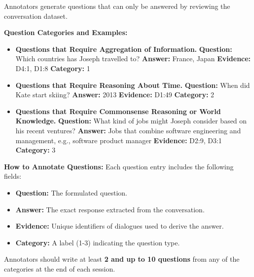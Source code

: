 \begin{tcolorbox}[title=Question \& Event Annotation Guidelines, myboxstyle, breakable]
\begin{description}[align=left, labelwidth=5em, labelindent=0em, itemsep=1em]
\item[\textbf{Sub-Task 2: Creating Questions and Answers.}] Annotators generate questions that can only be answered by reviewing the conversation dataset.

    \textbf{Question Categories and Examples:}
    \begin{itemize}
        \item \textbf{Questions that Require Aggregation of Information.} \newline
            \textbf{Question:} Which countries has Joseph travelled to? \newline
            \textbf{Answer:} France, Japan \newline
            \textbf{Evidence:} D4:1, D1:8 \newline
            \textbf{Category:} 1
        \item \textbf{Questions that Require Reasoning About Time.} \newline
            \textbf{Question:} When did Kate start skiing? \newline
            \textbf{Answer:} 2013 \newline
            \textbf{Evidence:} D1:49 \newline
            \textbf{Category:} 2
        \item \textbf{Questions that Require Commonsense Reasoning or World Knowledge.} \newline
            \textbf{Question:} What kind of jobs might Joseph consider based on his recent ventures? \newline
            \textbf{Answer:} Jobs that combine software engineering and management, e.g., software product manager \newline
            \textbf{Evidence:} D2:9, D3:1 \newline
            \textbf{Category:} 3
    \end{itemize}

    \textbf{How to Annotate Questions:}  
    Each question entry includes the following fields:
    \begin{itemize}
        \item \textbf{Question:} The formulated question.
        \item \textbf{Answer:} The exact response extracted from the conversation.
        \item \textbf{Evidence:} Unique identifiers of dialogues used to derive the answer.
        \item \textbf{Category:} A label (1-3) indicating the question type.
    \end{itemize}
    Annotators should write at least \textbf{2 and up to 10 questions} from any of the categories at the end of each session.


\end{description}
\end{tcolorbox}


